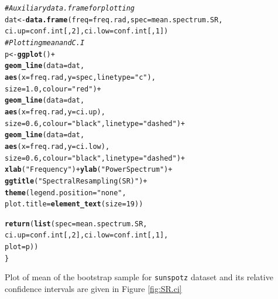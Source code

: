 \documentclass{article}\usepackage[]{graphicx}\usepackage[]{color}
\makeatletter
\newcommand{\hlnum}[1]{\textcolor[rgb]{0.686,0.059,0.569}{#1}}%
\newcommand{\hlstr}[1]{\textcolor[rgb]{0.192,0.494,0.8}{#1}}%
\newcommand{\hlcom}[1]{\textcolor[rgb]{0.678,0.584,0.686}{\textit{#1}}}%
\newcommand{\hlopt}[1]{\textcolor[rgb]{0,0,0}{#1}}%
\newcommand{\hlstd}[1]{\textcolor[rgb]{0.345,0.345,0.345}{#1}}%
\newcommand{\hlkwb}[1]{\textcolor[rgb]{0.69,0.353,0.396}{#1}}%
\newcommand{\hlkwc}[1]{\textcolor[rgb]{0.333,0.667,0.333}{#1}}%
\newcommand{\hlkwd}[1]{\textcolor[rgb]{0.737,0.353,0.396}{\textbf{#1}}}%
\newenvironment{kframe}{%
 \def\at@end@of@kframe{}%
 \ifinner\ifhmode%
  \def\at@end@of@kframe{\end{minipage}}%
  \begin{minipage}{\columnwidth}%
 \fi\fi%
 \def\FrameCommand##1{\hskip\@totalleftmargin \hskip-\fboxsep
 \colorbox{shadecolor}{##1}\hskip-\fboxsep
     \hskip-\linewidth \hskip-\@totalleftmargin \hskip\columnwidth}%
 \MakeFramed {\advance\hsize-\width
   \@totalleftmargin\z@ \linewidth\hsize
   \@setminipage}}%
 {\par\unskip\endMakeFramed%
 \at@end@of@kframe}
\newenvironment{knitrout}{}{} %
\makeatother
\begin{document}
\begin{knitrout}
\begin{kframe}
\begin{alltt}
  \hlcom{# Auxiliary data.frame for plotting}
  \hlstd{dat} \hlkwb{<-} \hlkwd{data.frame}\hlstd{(}\hlkwc{freq} \hlstd{= freq.rad,} \hlkwc{spec} \hlstd{= mean.spectrum.SR,}
                    \hlkwc{ci.up} \hlstd{= conf.int[,} \hlnum{2}\hlstd{],} \hlkwc{ci.low} \hlstd{= conf.int[,} \hlnum{1}\hlstd{])}
  \hlcom{# Plotting mean and C.I}
  \hlstd{p} \hlkwb{<-} \hlkwd{ggplot}\hlstd{()} \hlopt{+}
    \hlkwd{geom_line}\hlstd{(}\hlkwc{data} \hlstd{= dat,}
              \hlkwd{aes}\hlstd{(}\hlkwc{x} \hlstd{= freq.rad,} \hlkwc{y} \hlstd{= spec,} \hlkwc{linetype} \hlstd{=} \hlstr{"c"}\hlstd{),}
              \hlkwc{size} \hlstd{=} \hlnum{1.0}\hlstd{,} \hlkwc{colour} \hlstd{=} \hlstr{"red"}\hlstd{)} \hlopt{+}
    \hlkwd{geom_line}\hlstd{(}\hlkwc{data} \hlstd{= dat,}
              \hlkwd{aes}\hlstd{(}\hlkwc{x} \hlstd{= freq.rad,} \hlkwc{y} \hlstd{= ci.up),}
              \hlkwc{size} \hlstd{=} \hlnum{0.6}\hlstd{,} \hlkwc{colour} \hlstd{=} \hlstr{"black"}\hlstd{,} \hlkwc{linetype} \hlstd{=} \hlstr{"dashed"}\hlstd{)} \hlopt{+}
    \hlkwd{geom_line}\hlstd{(}\hlkwc{data} \hlstd{= dat,}
              \hlkwd{aes}\hlstd{(}\hlkwc{x} \hlstd{= freq.rad,} \hlkwc{y} \hlstd{= ci.low),}
              \hlkwc{size} \hlstd{=} \hlnum{0.6}\hlstd{,} \hlkwc{colour} \hlstd{=} \hlstr{"black"}\hlstd{,} \hlkwc{linetype} \hlstd{=} \hlstr{"dashed"}\hlstd{)} \hlopt{+}
    \hlkwd{xlab}\hlstd{(}\hlstr{"Frequency"}\hlstd{)} \hlopt{+} \hlkwd{ylab}\hlstd{(}\hlstr{"Power Spectrum"}\hlstd{)} \hlopt{+}
    \hlkwd{ggtitle}\hlstd{(}\hlstr{"Spectral Resampling (SR)"}\hlstd{)} \hlopt{+}
    \hlkwd{theme}\hlstd{(}\hlkwc{legend.position} \hlstd{=} \hlstr{"none"}\hlstd{,}
          \hlkwc{plot.title} \hlstd{=} \hlkwd{element_text}\hlstd{(}\hlkwc{size} \hlstd{=} \hlnum{19}\hlstd{))}


  \hlkwd{return}\hlstd{(}\hlkwd{list}\hlstd{(}\hlkwc{spec} \hlstd{= mean.spectrum.SR,}
              \hlkwc{ci.up} \hlstd{= conf.int[,} \hlnum{2}\hlstd{],} \hlkwc{ci.low} \hlstd{= conf.int[,} \hlnum{1}\hlstd{],}
              \hlkwc{plot} \hlstd{= p))}
\hlstd{\}}
\end{alltt}
\end{kframe}
\end{knitrout}

Plot of mean of the bootstrap sample for \texttt{sunspotz} dataset and its relative confidence intervals are given in Figure \ref{fig:SR.ci}
\end{document}
